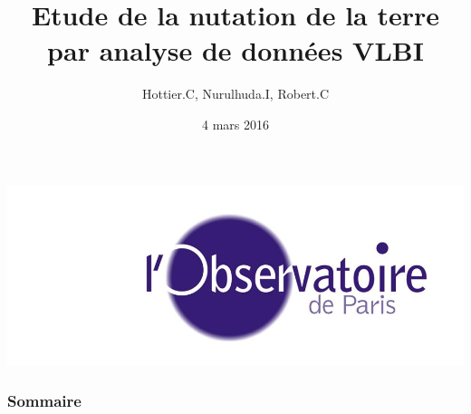 \documentclass[french]{beamer}
\title[Soutenance MT3]{Etude de la nutation de la terre par analyse de données VLBI}
\author{
Hottier.C, Nurulhuda.I, Robert.C}
\date{4 mars 2016}
\begin{document}
\begin{frame}
  \maketitle
  \begin{center}
    \includegraphics[height=0.20\textheight]{Figures/siteon0.jpg}
  \end{center}
\end{frame}

\begin{frame}
  \frametitle{Sommaire}
  \tableofcontents
\end{frame}














\end{document}
